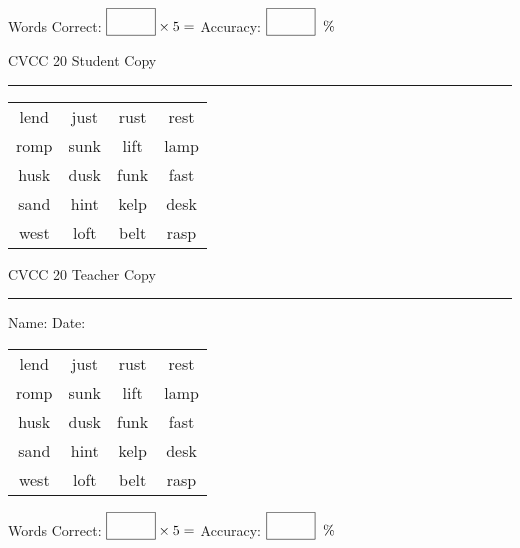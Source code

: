 \documentclass{memoir}
\begin{document}
\small

Words Correct: $\fbox{\phantom{\huge 100}} \times 5 = $ Accuracy: $\fbox{\phantom{\huge 100}}\;\; \%$ 

\vfill

\newpage



\footnotesize \noindent
CVCC 20 \hfill Student Copy
\smallskip
\hrule

\Large

\setlength{\tabcolsep}{14pt}
\def\arraystretch{3}

{\selectfont


\begin{vplace}[0.5]
\begin{center}
\begin{tabular}{cccc}
lend & just & rust & rest \\
romp & sunk & lift & lamp \\
husk & dusk & funk & fast \\
sand & hint & kelp & desk \\
west & loft & belt & rasp \\
\end{tabular}
\end{center}
\end{vplace}

}

\newpage

\footnotesize \noindent
CVCC 20 \hfill Teacher Copy
\smallskip
\hrule

\small

\vfill

\noindent
Name: \underline{\hspace{1.75in}} \hfill Date: \underline{\hspace{1in}}

\Large

{\selectfont


\begin{vplace}[0.5]
\begin{center}
\begin{tabular}{cccc}
lend & just & rust & rest \\
romp & sunk & lift & lamp \\
husk & dusk & funk & fast \\
sand & hint & kelp & desk \\
west & loft & belt & rasp \\
\end{tabular}
\end{center}
\end{vplace}



}

\small

Words Correct: $\fbox{\phantom{\huge 100}} \times 5 = $ Accuracy: $\fbox{\phantom{\huge 100}}\;\; \%$ 

\vfill

\end{document}
